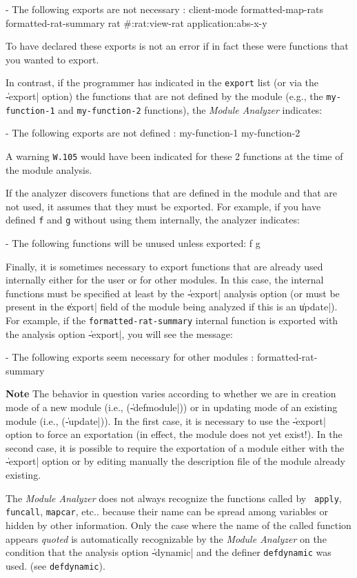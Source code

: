 \begin{Longcode*}
- The following exports are not necessary :
 client-mode
 formatted-map-rats
 formatted-rat-summary
 rat
 #:rat:view-rat
 {application}:abs-x-y
\end{Longcode*}

To have declared these exports is not an error if in fact these were functions that you wanted to export.

In contrast, if the programmer has indicated in the {\tt export} list (or via the \|-export| option) the functions that are not defined by the module (e.g., the {\tt my-function-1} and {\tt my-function-2} functions), the {\it Module Analyzer} indicates:
\begin{Longcode*}
- The following exports are not defined :
 my-function-1
 my-function-2
\end{Longcode*}
A warning {\tt W.105} would have been indicated for these 2 functions at the time of the module analysis.

If the analyzer discovers functions that are defined in the module and that are not used, it assumes that they must be exported.  For example, if you have defined {\tt f} and {\tt g} without using them internally, the analyzer indicates:
\begin{Longcode*}
- The following functions will be unused unless exported:
 f
 g
\end{Longcode*}

Finally, it is sometimes necessary to export functions that are already used internally either for the user or for other modules.  In this case, the internal functions must be specified at least by the \|-export| analysis option (or must be present in the \|export| field of the module being analyzed if this is an \|update|).
For example, if the {\tt formatted-rat-summary} internal function is exported with the analysis option \|-export|, you will see the message: 
\begin{Longcode*}
- The following exports seem necessary for other modules :
     formatted-rat-summary
\end{Longcode*}
\begin{Side}{\bf Note}
The behavior in question varies according to whether we are in creation mode of a new module (i.e., (\|-defmodule|)) or in updating mode of an existing module (i.e., (\|-update|)).  In the first case, it is necessary to use the \|-export| option to force an exportation (in effect, the module does not yet exist!).  In the second case, it is possible to require the exportation of a module either with the \|-export| option or by editing manually the description file of the module already existing. 
\end{Side}
The {\em Module Analyzer} does not always recognize the functions called by {\tt
apply}, {\tt funcall}, {\tt mapcar}, etc.. because their name can be spread among variables or hidden by other information.  Only the case where the name of the called function appears {\em quoted} is automatically recognizable by the {\em Module Analyzer} on the condition that the analysis option \|-dynamic| and the definer {\tt defdynamic} was used.  (see {\tt defdynamic}).   

